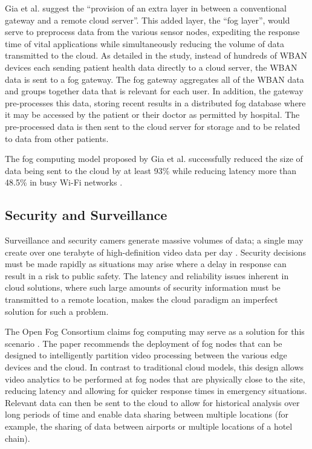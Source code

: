 \documentclass{article}
\begin{document}
Gia et al. \cite{gia2015fog} suggest the ``provision of an extra layer in between a conventional gateway and a remote cloud server''. This added layer, the ``fog layer'', would serve to preprocess data from the various sensor nodes, expediting the response time of vital applications while simultaneously reducing the volume of data transmitted to the cloud. As detailed in the study, instead of hundreds of WBAN devices each sending patient health data directly to a cloud server, the WBAN data is sent to a fog gateway. The fog gateway aggregates all of the WBAN data and groups together data that is relevant for each user. In addition, the gateway pre-processes this data, storing recent results in a distributed fog database where it may be accessed by the patient or their doctor as permitted by hospital. The pre-processed data is then sent to the cloud server for storage and to be related to data from other patients.

The fog computing model proposed by Gia et al. successfully reduced the size of data being sent to the cloud by at least 93\% while reducing latency more than 48.5\% in busy Wi-Fi networks \cite{gia2015fog}.

\subsection{Security and Surveillance}
Surveillance and security camers generate massive volumes of data; a single may create over one terabyte of high-definition video data per day \cite{openfogconsortium2017visualsecurity}. Security decisions must be made rapidly as situations may arise where a delay in response can result in a risk to public safety. The latency and reliability issues inherent in cloud solutions, where such large amounts of security information must be transmitted to a remote location, makes the cloud paradigm an imperfect solution for such a problem.

The Open Fog Consortium claims fog computing may serve as a solution for this scenario \cite{openfogconsortium2017visualsecurity}. The paper recommends the deployment of fog nodes that can be designed to intelligently partition video processing between the various edge devices and the cloud. In contrast to traditional cloud models, this design allows video analytics to be performed at fog nodes that are physically close to the site, reducing latency and allowing for quicker response times in emergency situations. Relevant data can then be sent to the cloud to allow for historical analysis over long periods of time and enable data sharing between multiple locations \cite{openfogconsortium2017visualsecurity} (for example, the sharing of data between airports or multiple locations of a hotel chain).
\end{document}
